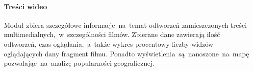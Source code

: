 \paragraph{Treści wideo}
Moduł zbiera szczegółowe informacje~na~temat odtworzeń zamieszczonych treści multimedialnych,~w~szczególności filmów. Zbierane dane zawierają ilość odtworzeń, czas oglądania,~a~także wykres procentowy liczby widzów oglądających dany fragment filmu. Ponadto wyświetlenia~są~nanoszone~na~mapę pozwalając~na~analizę popularności geograficznej.
